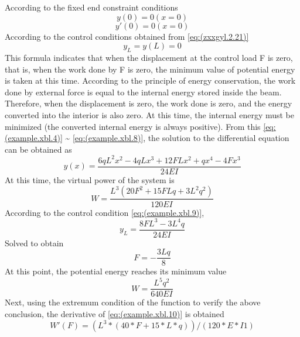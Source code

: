 According to the fixed end constraint conditions
\begin{equation}\label{eq:(example.xbl.7)}
y(0)=0 (x=0)
\end{equation}
\begin{equation}\label{eq:(example.xbl.8)}
y'(0)=0 (x=0)
\end{equation}
According to the control conditions obtained from \ref{eq:(zxxgyl.2.21)}
\begin{equation}\label{eq:(example.xbl.9)}
y_L=y(L)=0
\end{equation}
This formula indicates that when the displacement at the control load F is zero, that is, when the work done by F is zero, the minimum value of potential energy is taken at this time. According to the principle of energy conservation, the work done by external force is equal to the internal energy stored inside the beam. Therefore, when the displacement is zero, the work done is zero, and the energy converted into the interior is also zero. At this time, the internal energy must be minimized (the converted internal energy is always positive).
From this \ref{eq:(example.xbl.4)} \~{} \ref{eq:(example.xbl.8)}, the solution to the differential equation can be obtained as
\begin{equation}\label{eq:(example.xbl.10)}
y(x)=\frac{6qL^2x^2-4qLx^3+12FLx^2+qx^4-4Fx^3}{24EI}
\end{equation}
At this time, the virtual power of the system is
\begin{equation}\label{eq:(example.xbl.11)}
W=\frac{L^3(20F^2 + 15FLq + 3L^2q^2)}{120EI}
\end{equation}
According to the control condition \ref{eq:(example.xbl.9)},
\begin{equation}\label{eq:(example.xbl.12)}
y_L=\frac{8FL^3-3L^4q}{24EI}
\end{equation}
Solved to obtain
\begin{equation}\label{eq:(example.xbl.13)}
F=-\frac{3Lq}{8}
\end{equation}
At this point, the potential energy reaches its minimum value
\begin{equation}\label{eq:(example.xbl.14)}
W=\frac{L^5q^2}{640EI}
\end{equation}
Next, using the extremum condition of the function to verify the above conclusion, the derivative of \ref{eq:(example.xbl.10)} is obtained
\begin{equation}\label{eq:(example.xbl.15)}
W'(F)= (L^3*(40*F + 15*L*q))/(120*E*I1)
\end{equation}
